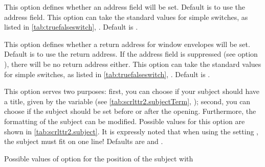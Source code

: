 \begin{Declaration}
\end{Declaration}
%
This option defines whether an address field will be set. Default is
to use the address field. This option can take the standard values for
simple switches, as listed in
\autoref{tab:truefalseswitch},
. Default is
.
%
%

\begin{Declaration}
\end{Declaration}
%
This option defines whether a return address for window envelopes will
be set. Default is to use the return address. If the address field is
suppressed (see option ), there will be no return
address either. This option can take the standard values for simple
switches, as listed in \autoref{tab:truefalseswitch},
.
Default is .
%
%

\begin{Declaration}
\end{Declaration}
%
This option serves two purposes: first, you can choose if your
subject should have a title, given by the
 variable (see \autoref{tab:scrlttr2.subjectTerm},
); second, you can choose if the
subject should be set before or after the opening. Furthermore, the
formatting of the subject can be
modified. Possible values for this option are shown in
\autoref{tab:scrlttr2.subject}. It is expressly noted that when using
the setting , the subject must fit on one line!
Defaults are  and .
\begin{table}
  \caption[{Possible values of option  with
    }]{Possible values of option  for the
    position of the subject with
    }
  \label{tab:scrlttr2.subject}
  \begin{desctabular}
  \end{desctabular}
\end{table}
%
%

